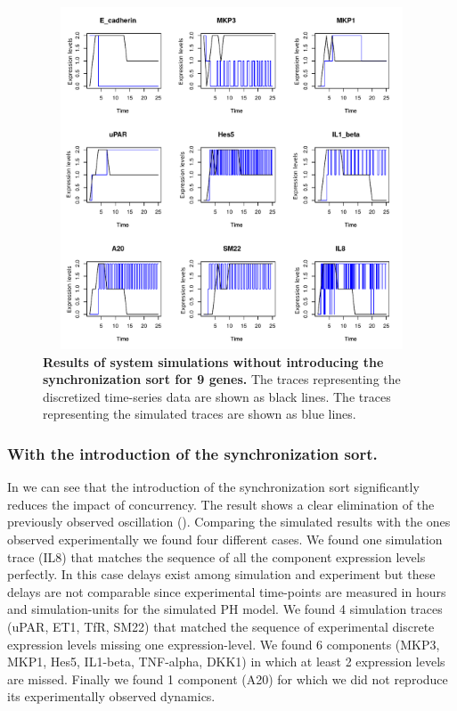 \begin{figure}[H]
\centering
\includegraphics[width=5in,height=4in]{images/resultWOS.pdf}
\caption{{\bf Results of system simulations without introducing the synchronization sort for 9 genes.} The 
traces representing the discretized time-series data are shown as black lines.  The traces representing the simulated traces are shown as blue lines.}
\label{fig:rwos}
\end{figure}

\subsubsection{With the introduction of the synchronization sort.}
In  we can see that the introduction of the synchronization sort significantly reduces the 
impact of concurrency. The result shows  a 
clear elimination of the previously observed oscillation (). 
Comparing the simulated results with the ones observed experimentally we found four different cases.
We found one simulation trace (IL8) that matches the sequence of all the component expression levels perfectly.  In this case delays exist among simulation and experiment but 
these delays are not comparable since experimental time-points are measured in hours and simulation-units for the simulated PH model.
We found 4 simulation traces (uPAR, ET1, TfR, SM22) that matched the sequence of experimental discrete expression levels missing one expression-level.
We found 6 components (MKP3, MKP1, Hes5, IL1-beta, TNF-alpha, DKK1) in which at least 2 expression levels are missed.
Finally we found 1 component (A20) for which we did not reproduce its experimentally observed dynamics.


